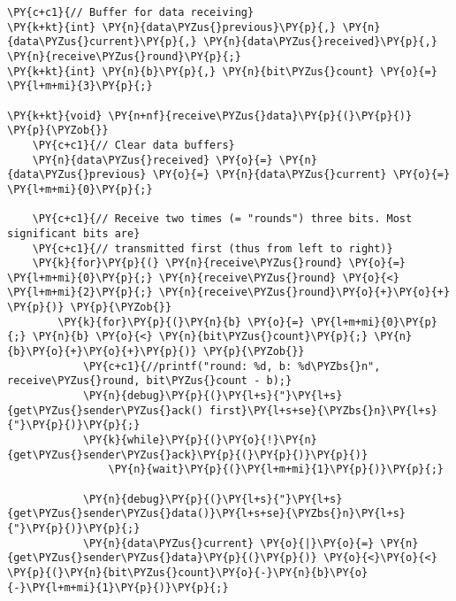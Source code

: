 \begin{Verbatim}[commandchars=\\\{\}]
\PY{c+c1}{// Buffer for data receiving}
\PY{k+kt}{int} \PY{n}{data\PYZus{}previous}\PY{p}{,} \PY{n}{data\PYZus{}current}\PY{p}{,} \PY{n}{data\PYZus{}received}\PY{p}{,} \PY{n}{receive\PYZus{}round}\PY{p}{;}
\PY{k+kt}{int} \PY{n}{b}\PY{p}{,} \PY{n}{bit\PYZus{}count} \PY{o}{=} \PY{l+m+mi}{3}\PY{p}{;}

\PY{k+kt}{void} \PY{n+nf}{receive\PYZus{}data}\PY{p}{(}\PY{p}{)} \PY{p}{\PYZob{}}
    \PY{c+c1}{// Clear data buffers}
    \PY{n}{data\PYZus{}received} \PY{o}{=} \PY{n}{data\PYZus{}previous} \PY{o}{=} \PY{n}{data\PYZus{}current} \PY{o}{=} \PY{l+m+mi}{0}\PY{p}{;}

    \PY{c+c1}{// Receive two times (= "rounds") three bits. Most significant bits are}
    \PY{c+c1}{// transmitted first (thus from left to right)}
    \PY{k}{for}\PY{p}{(} \PY{n}{receive\PYZus{}round} \PY{o}{=} \PY{l+m+mi}{0}\PY{p}{;} \PY{n}{receive\PYZus{}round} \PY{o}{<} \PY{l+m+mi}{2}\PY{p}{;} \PY{n}{receive\PYZus{}round}\PY{o}{+}\PY{o}{+} \PY{p}{)} \PY{p}{\PYZob{}}
        \PY{k}{for}\PY{p}{(}\PY{n}{b} \PY{o}{=} \PY{l+m+mi}{0}\PY{p}{;} \PY{n}{b} \PY{o}{<} \PY{n}{bit\PYZus{}count}\PY{p}{;} \PY{n}{b}\PY{o}{+}\PY{o}{+}\PY{p}{)} \PY{p}{\PYZob{}}
            \PY{c+c1}{//printf("round: %d, b: %d\PYZbs{}n", receive\PYZus{}round, bit\PYZus{}count - b);}
            \PY{n}{debug}\PY{p}{(}\PY{l+s}{"}\PY{l+s}{get\PYZus{}sender\PYZus{}ack() first}\PY{l+s+se}{\PYZbs{}n}\PY{l+s}{"}\PY{p}{)}\PY{p}{;}
            \PY{k}{while}\PY{p}{(}\PY{o}{!}\PY{n}{get\PYZus{}sender\PYZus{}ack}\PY{p}{(}\PY{p}{)}\PY{p}{)}
                \PY{n}{wait}\PY{p}{(}\PY{l+m+mi}{1}\PY{p}{)}\PY{p}{;}

            \PY{n}{debug}\PY{p}{(}\PY{l+s}{"}\PY{l+s}{get\PYZus{}sender\PYZus{}data()}\PY{l+s+se}{\PYZbs{}n}\PY{l+s}{"}\PY{p}{)}\PY{p}{;}
            \PY{n}{data\PYZus{}current} \PY{o}{|}\PY{o}{=} \PY{n}{get\PYZus{}sender\PYZus{}data}\PY{p}{(}\PY{p}{)} \PY{o}{<}\PY{o}{<} \PY{p}{(}\PY{n}{bit\PYZus{}count}\PY{o}{-}\PY{n}{b}\PY{o}{-}\PY{l+m+mi}{1}\PY{p}{)}\PY{p}{;}


\end{Verbatim}
